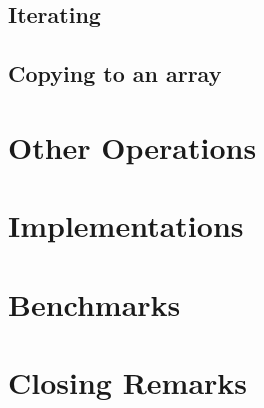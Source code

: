 \documentclass{article}
\begin{document}
	
	
	
	
	\subsection{Iterating}
	
	
	
	
	
	
	
	
	
	\subsection{Copying to an array}
	
	

	
	
	
	
	
	
	\section{Other Operations}
	
	\section{Implementations}
	
	\section{Benchmarks}
	
	\section{Closing Remarks}
	
	\newpage
	
	
\end{document}
